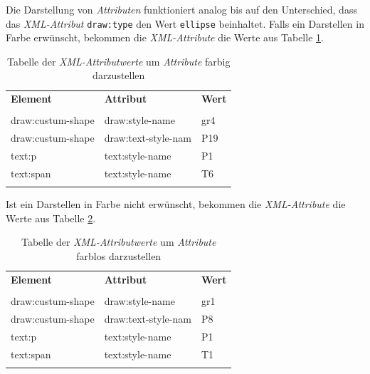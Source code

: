 \hon{}
\noindent
Die Darstellung von \textit{Attributen} funktioniert analog bis auf den Unterschied, dass das \textit{XML-Attribut} \verb|draw:type| den Wert \verb|ellipse| beinhaltet.
Falls ein Darstellen in Farbe erwünscht, bekommen die \textit{XML-Attribute} die Werte aus Tabelle \ref{tbl:beispieltabelle3}.

\begin{table}[H]
	\centering
	\begin{tabular}{lll}
		\textbf{Element} & \textbf{Attribut}  & \textbf{Wert} \\
		\\
		draw:custum-shape & draw:style-name           & gr4             \\
		draw:custum-shape & draw:text-style-nam      & P19             \\
		text:p & text:style-name       & P1             \\
		text:span & text:style-name       & T6            \\
		\\
	\end{tabular}
	
	\caption{Tabelle der \textit{XML-Attributwerte} um \textit{Attribute} farbig darzustellen}
	\label{tbl:beispieltabelle3}
	
\end{table}
\hon{}
\noindent
Ist ein Darstellen in Farbe nicht erwünscht, bekommen die \textit{XML-Attribute} die Werte aus Tabelle \ref{tbl:beispieltabelle4}.

\begin{table}[H]
	\centering
	\begin{tabular}{lll}
		\textbf{Element} & \textbf{Attribut}  & \textbf{Wert} \\
		\\
		draw:custum-shape & draw:style-name           & gr1             \\
		draw:custum-shape & draw:text-style-nam      & P8            \\
		text:p & text:style-name       & P1             \\
		text:span & text:style-name       & T1             \\
		\\
	\end{tabular}
	
	\caption{Tabelle der \textit{XML-Attributwerte} um \textit{Attribute} farblos darzustellen}
	\label{tbl:beispieltabelle4}
	
\end{table}

